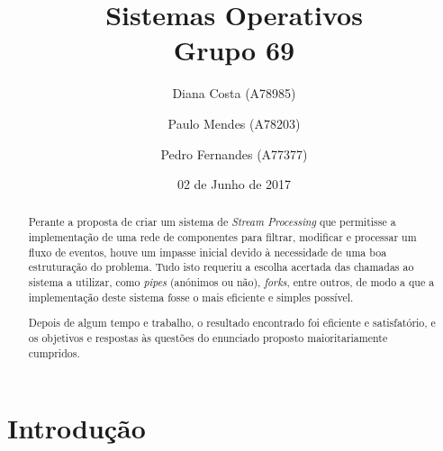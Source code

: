 \documentclass[a4paper]{article}
\title{Sistemas Operativos \\Grupo 69}
\author{Diana Costa (A78985) \and Paulo Mendes (A78203) \and Pedro Fernandes (A77377) }
\date{02 de Junho de 2017}
\begin{document}
\maketitle

\begin{abstract}

\hspace{3mm} Perante a proposta de criar um sistema de \emph{Stream Processing} que permitisse a implementação de uma rede de componentes para filtrar, modificar e processar um fluxo de eventos, houve um impasse inicial devido à necessidade de uma boa estruturação do problema. Tudo isto requeriu a escolha acertada das chamadas ao sistema a utilizar, como \emph{pipes} (anónimos ou não), \emph{forks}, entre outros, de modo a que a implementação deste sistema fosse o mais eficiente e simples possível.

Depois de algum tempo e trabalho, o resultado encontrado foi eficiente e satisfatório, e os objetivos e respostas às questões do enunciado proposto maioritariamente cumpridos.

\end{abstract}

\tableofcontents

\pagebreak
\section{Introdução}
\label{sec:1}
\end{document}
